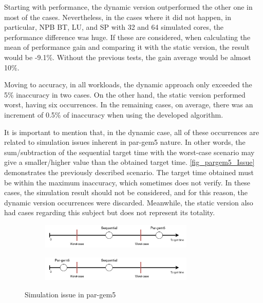Starting with performance, the dynamic version outperformed the other one in most of the cases. Nevertheless, in the cases where it 
did not happen, in particular, NPB BT, LU, and SP with 32 and 64 simulated cores, the performance difference was huge. If these are considered,
when calculating the mean of performance gain and comparing it with the static version, the result would be -9.1\%. Without the previous 
tests, the gain average would be almost 10\%. 

Moving to accuracy, in all workloads, the dynamic approach only exceeded the 5\% inaccuracy in two cases. On the other hand, the static 
version performed worst, having six occurrences. In the remaining cases, on average, there was an increment of 0.5\% of inaccuracy when 
using the developed algorithm.

It is important to mention that, in the dynamic case, all of these occurrences are related to 
simulation issues inherent in par-gem5 nature. In other words, the sum/subtraction of the sequential target time with the 
worst-case scenario may give a smaller/higher value than the obtained target time. \autoref{fig_pargem5_Issue} demonstrates the previously described 
scenario. The target time obtained must be within the maximum inaccuracy, which sometimes does not verify. In these cases, the simulation result 
should not be considered, and for this reason, the dynamic version occurrences were discarded. Meanwhile, the static version also had cases regarding 
this subject but does not represent its totality. %

\begin{figure}[H]
    \centering
    \begin{subfigure}{\textwidth}
        \centering
        \includegraphics[width=0.8\textwidth]{Images/pargem5_Issue1.png}
    \end{subfigure}
    \begin{subfigure}{\textwidth}
        \centering
        \includegraphics[width=0.8\textwidth]{Images/pargem5_Issue2.png}
    \end{subfigure}

    \caption{Simulation issue in par-gem5}
	\label{fig_pargem5_Issue}
\end{figure}

